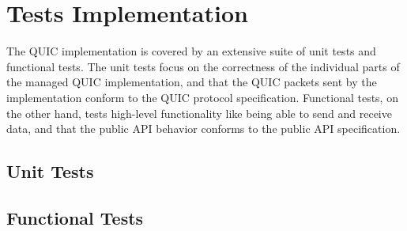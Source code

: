 \section{Tests Implementation}

The QUIC implementation is covered by an extensive suite of unit tests and functional tests. The
unit tests focus on the correctness of the individual parts of the managed QUIC implementation, and
that the QUIC packets sent by the implementation conform to the QUIC protocol specification.
Functional tests, on the other hand, tests high-level functionality like being able to send and
receive data, and that the public API behavior conforms to the public API specification.

\subsection{Unit Tests}

\subsection{Functional Tests}
